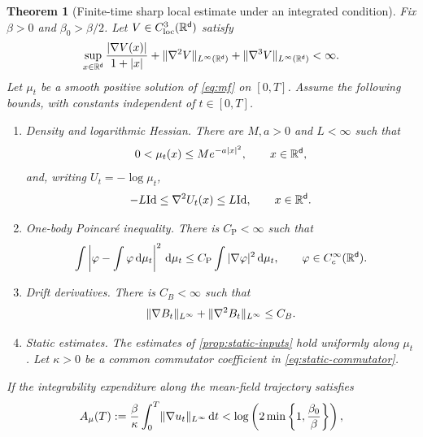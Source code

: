 \documentclass[11pt,reqno]{amsart}
\numberwithin{equation}{section}
\theoremstyle{plain}
\newtheorem{thm}{Theorem}[section]
\theoremstyle{remark}
\DeclarePairedDelimiter{\norm}{\lVert}{\rVert}
\renewcommand{\d}{\mathsf{d}}\newcommand{\s}{\mathsf{s}}
\newcommand{\Id}{\mathrm{Id}}
\begin{document}
\begin{thm}[Finite-time sharp local estimate under an integrated condition]\label{thm:finite}
\begingroup
Fix $\beta>0$ and $\beta_0>\beta/2$. Let $V\in C_{\mathrm{loc}}^3(\R^\d)$ satisfy
\begin{equation}\label{eq:intro-V-regularity}
 \sup_{x\in\R^\d}\frac{|\nabla V(x)|}{1+|x|}+\norm{\nabla^2V}_{L^\infty(\R^\d)}+\norm{\nabla^3V}_{L^\infty(\R^\d)}<\infty.
\end{equation}
Let $\mu_t$ be a smooth positive solution of \eqref{eq:mf} on $[0,T]$.
\endgroup Assume the following bounds, with constants independent of $t\in[0,T]$.
\begin{enumerate}[label=\textup{(\roman*)},leftmargin=2.4em,itemsep=7pt]
\item \emph{Density and logarithmic Hessian.} There are $M,a>0$ and $L<\infty$ such that
\begin{equation}\label{eq:intro-density-bound}
 0<\mu_t(x)\le M e^{-a|x|^2},\qquad x\in\R^\d,
\end{equation}
and, writing $U_t=-\log\mu_t$,
\begin{equation}\label{eq:intro-hessian-bound}
 -L\Id\le\nabla^2U_t(x)\le L\Id,\qquad x\in\R^\d.
\end{equation}
\item \emph{One-body Poincar\'e inequality.} There is $C_{\mathrm P}<\infty$ such that
\begin{equation}\label{eq:intro-poincare-bound}
 \int\left|\varphi-\int\varphi\dd\mu_t\right|^2\dd\mu_t
 \le C_{\mathrm P}\int|\nabla\varphi|^2\dd\mu_t,
 \qquad \varphi\in C_c^\infty(\R^\d).
\end{equation}
\item \emph{Drift derivatives.} There is $C_B<\infty$ such that
\begin{equation}\label{eq:intro-drift-bound}
 \norm{\nabla B_t}_{L^\infty}+\norm{\nabla^2B_t}_{L^\infty}\le C_B.
\end{equation}
\item \emph{Static estimates.} The estimates of \cref{prop:static-inputs} hold uniformly along $\mu_t$. Let $\kappa>0$ be a common commutator coefficient in \eqref{eq:static-commutator}.
\end{enumerate}
If the \emph{integrability expenditure along the mean-field trajectory} satisfies
\begin{equation}\label{eq:expenditure}
 A_\mu(T):=\frac\beta\kappa\int_0^T\norm{\nabla u_t}_{L^\infty}\dd t
 <\log\left(2\min\left\{1,\frac{\beta_0}{\beta}\right\}\right),

\end{equation}
\end{thm}
\end{document}
